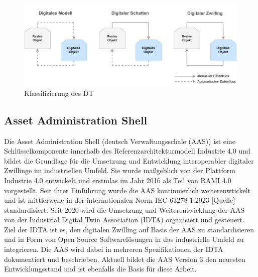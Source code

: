 
\begin{figure}[htbp]
    \centering
    \includegraphics[width=1\textwidth]{Bilder/klassifizierung_DT.pdf}
    \caption{Klassifizierung des DT}
    \label{fig:klassifizierungDT}
\end{figure}







\subsection{Asset Administration Shell}
Die Asset Administration Shell (deutsch Verwaltungsschale (AAS)) ist eine Schlüsselkomponente innerhalb des Referenzarchitekturmodell Industrie 4.0 \cite{RAMI4.0} und bildet die Grundlage für die Umsetzung und Entwicklung interoperabler digitaler Zwillinge im industriellen Umfeld.
Sie wurde maßgeblich von der Plattform Industrie 4.0 entwickelt und erstmlas im Jahr 2016 als Teil von RAMI 4.0 vorgestellt.
Seit ihrer Einführung wurde die AAS kontinuierlich weiterenwtickelt und ist mittlerweile in der internationalen Norm IEC 63278-1:2023 [Quelle] standardisiert.
Seit 2020 wird die Umsetzung und Weiterentwicklung der AAS von der Industrial Digital Twin Association (IDTA) organisiert und gesteuert.
Ziel der IDTA ist es, den digitalen Zwilling auf Basis der AAS zu standardisieren und in Form von Open Source Softwarelösungen in das industrielle Umfeld zu integrieren.
Die AAS wird dabei in mehreren Spezifikationen der IDTA dokumentiert und beschrieben.
Aktuell bildet die AAS Version 3 den neuesten Entwicklungsstand und ist ebenfalls die Basis für diese Arbeit.

